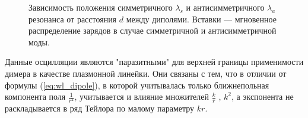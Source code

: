 \begin{figure}
\caption{Зависимость положения симметричного $ \lambda_s $ и антисимметричного $ \lambda_a $ резонанса от расстояния $ d $ между диполями. Вставки --- мгновенное распределение зарядов в случае симметричной и антисимметричной моды.}
\label{img:2D_res}
\end{figure}
Данные осцилляции являются "паразитными" для верхней границы применимости димера в качестве плазмонной линейки. Они связаны с тем, что в отличии от формулы (\ref{eq:wl_dipole}), в которой учитывалась только ближнепольная компонента поля $ \frac{1}{r^2} $, учитывается и влияние множителей $ \frac{k}{r} $ , $ k^2 $, а экспонента не раскладывается в ряд Тейлора по малому параметру $ kr $.

